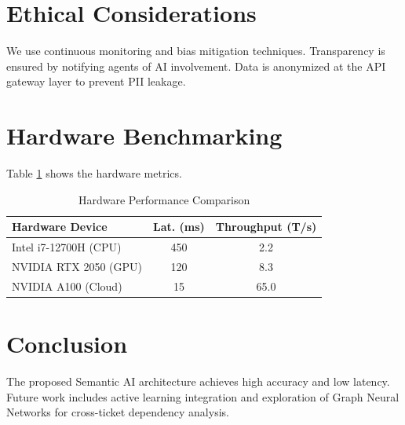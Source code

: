 \documentclass[conference]{IEEEtran}
\begin{document}
\section{Ethical Considerations}
We use continuous monitoring and bias mitigation techniques. Transparency is ensured by notifying agents of AI involvement. Data is anonymized at the API gateway layer to prevent PII leakage.

\section{Hardware Benchmarking}
Table \ref{tab:hw_perf} shows the hardware metrics.

\begin{table}[htbp]
\caption{Hardware Performance Comparison}
\begin{center}
\begin{tabular}{|l|c|c|}
\hline
\textbf{Hardware Device} & \textbf{Lat. (ms)} & \textbf{Throughput (T/s)} \\
\hline
Intel i7-12700H (CPU) & 450 & 2.2 \\
NVIDIA RTX 2050 (GPU) & 120 & 8.3 \\
NVIDIA A100 (Cloud) & 15 & 65.0 \\
\hline
\end{tabular}
\label{tab:hw_perf}
\end{center}
\end{table}

\section{Conclusion}
The proposed Semantic AI architecture achieves high accuracy and low latency. Future work includes active learning integration and exploration of Graph Neural Networks for cross-ticket dependency analysis.
\end{document}

